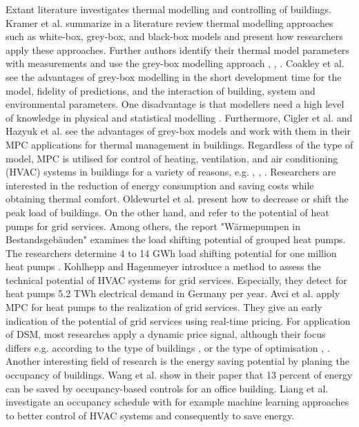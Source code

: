     Extant literature investigates thermal modelling and controlling of buildings. Kramer et al. \cite{Kramer.2012} summarize in a literature review thermal modelling approaches such as white-box, grey-box, and black-box models and present how researchers apply these approaches. Further authors identify their thermal model parameters with measurements and use the grey-box modelling approach \cite{Harb.2016}, \cite{Freund.2020}, \cite{EvelynSperber.2019}. Coakley et al. \cite{Coakley.2014} see the advantages of grey-box modelling in the short development time for the model, fidelity of predictions, and the interaction of building, system and environmental parameters. One disadvantage is that modellers need a high level of knowledge in physical and statistical modelling \cite{Coakley.2014}. Furthermore, Cigler et al. \cite{JiriCigler.} and Hazyuk et al. \cite{Hazyuk.2012b} see the advantages of grey-box models and work with them in their MPC applications for thermal management in buildings. 
    \newline
    Regardless of the type of model, MPC is utilised for control of heating, ventilation, and air conditioning (HVAC)  systems in buildings for a variety of reasons, e.g. \cite{Hazyuk.2012b}, \cite{Zwickel.2019}, \cite{Oldewurtel.2010}. Researchers are interested in the reduction of energy consumption \cite{Hazyuk.2012b} and saving costs \cite{Zwickel.2019} while obtaining thermal comfort. Oldewurtel et al. \cite{Oldewurtel.2010} present how to decrease or shift the peak load of buildings.
    \newline
    On the other hand, \cite{WPimBestand.2020} and \cite{Kohlhepp.2017} refer to the potential of heat pumps for grid services. Among others, the report "Wärmepumpen in Bestandsgebäuden" examines the load shifting potential of grouped heat pumps. The researchers determine 4 to 14 GWh load shifting potential for one million heat pumps \cite{WPimBestand.2020}.
    Kohlhepp and Hagenmeyer \cite{Kohlhepp.2017} introduce a method to assess the technical potential of HVAC systems for grid services. Especially, they detect for heat pumps 5.2 TWh electrical demand in Germany per year.
    \newline
    Avci et al. \cite{Avci.2013} apply MPC for heat pumps to the realization of grid services. They give an early indication of the potential of grid services using real-time pricing. For application of DSM, most researches apply a dynamic price signal, although their focus differs e.g. according to the type of buildings \cite{Bianchini.2019}, \cite{Kim.2018} or the type of optimisation \cite{Bianchini.2019}, \cite{Bianchini.2016}.\newline 
    Another interesting field of research is the energy saving potential by planing the occupancy of buildings. Wang et al. \cite{Wang.2019} show in their paper that 13 percent of energy can be saved by occupancy-based controls for an office building. Liang et al. \cite{Liang.2016} investigate an occupancy schedule with for example machine learning approaches to better control of HVAC systems and consequently to save energy.\newline
    
